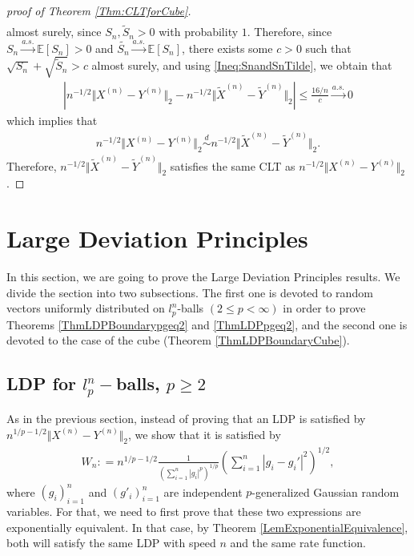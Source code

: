 \documentclass[10pt]{amsart}
\def\E{\mathbb{E}}
\numberwithin{equation}{section}
\begin{document}
\begin{proof}[proof of Theorem \ref{Thm:CLTforCube}]
\begin{align*}
\end{align*}
almost surely, since $S_n, \tilde{S}_n >0 $ with probability $1$. 
Therefore, since $S_n \overset{a.s.}{\to} \E [S_n] >0$ and $\tilde{S_n} \overset{a.s.}{\to} \E [S_n]$, there exists some $c>0$ such that $ \sqrt{S_n} + \sqrt{\tilde{S}_n} > c$ almost surely, and using \eqref{Ineq:SnandSnTilde}, we obtain that
\begin{align*}
\left| n^{-1/2} \Vert X^{(n)} - Y^{(n)} \Vert _2 - n^{-1/2} \Vert \tilde{X}^{(n)} - \tilde{Y}^{(n)} \Vert _2  \right| 
 \leq \frac{16/n}{c} \overset{a.s.}{\to} 0
\end{align*}
which implies that
\begin{align*}
n^{-1/2} \Vert X^{(n)} - Y^{(n)} \Vert _2 \overset{d}{\sim} n^{-1/2} \Vert \tilde{X}^{(n)} - \tilde{Y}^{(n)} \Vert _2.
\end{align*}
Therefore, $n^{-1/2} \Vert \tilde{X}^{(n)} - \tilde{Y}^{(n)} \Vert _2$ satisfies the same CLT as $n^{-1/2} \Vert X^{(n)} - Y^{(n)} \Vert _2$.
\end{proof}










\section{Large Deviation Principles}
\label{section5}

In this section, we are going to prove the Large Deviation Principles results. We divide the section into two subsections. The first one is devoted to random vectors uniformly distributed on $l_p^n$-balls $(2 \leq p < \infty)$ in order to prove Theorems \ref{ThmLDPBoundarypgeq2} and \ref{ThmLDPpgeq2}, and the second one is devoted to the case of the cube (Theorem \ref{ThmLDPBoundaryCube}).



\subsection{LDP for $l_p^n-$balls, $p\geq 2$}


As in the previous section, instead of proving that an LDP is satisfied by $n^{1/p - 1/2} \Vert X^{(n)} - Y^{(n)} \Vert _2$, we show that it is satisfied by
\begin{align*}
W_n : = n^{1/p - 1/2} \frac{1}{\left(\sum _{i=1}^n \left| g_i  \right|^p \right)^{1/p}} \left(  \sum_{i=1}^n \left| g_i - g_i' \right|^2 \right)^{1/2},
\end{align*} 
where $(g_i)_{i=1} ^n$ and $(g'_i)_{i=1} ^n$ are independent $p$-generalized Gaussian random variables.
For that, we need to first prove that these two expressions are exponentially equivalent. In that case, by Theorem \ref{LemExponentialEquivalence}, both will satisfy the same LDP with speed $n$ and the same rate function.
\end{document}
